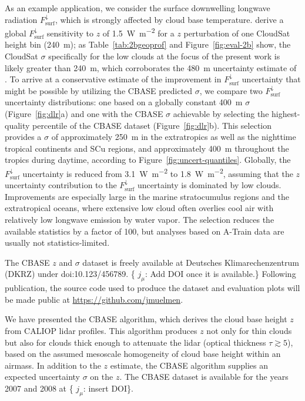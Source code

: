 \documentclass[essd,manuscript]{copernicus}\usepackage[]{graphicx}\usepackage[]{color}
\newcommand{\hlnum}[1]{\textcolor[rgb]{0.686,0.059,0.569}{#1}}%
\newcommand\comment[2]{\{\hlnum{ \textit{#1}: #2}\}}
\newcommand\commentjm[1]{\comment{$j_\mu$}{#1}}
\newcommand\CBH{\ensuremath{z}}
\newcommand\DLR{\ensuremath{F_\text{surf}^\downarrow}}
\begin{document}
As an example application, we consider the surface downwelling longwave
radiation \DLR{}, which is strongly affected by cloud base temperature.
\cite{Henderson2013} derive a global \DLR{} sensitivity to \CBH{} of
1.5~\unit{W~m^{-2}} for a \CBH{} perturbation of one CloudSat height bin
(240~\unit{m}); as Table~\ref{tab:2bgeoprof} and Figure~\ref{fig:eval-2b} show,
the CloudSat $\sigma$ specifically for the low clouds at the focus of the
present work is likely greater than 240~\unit{m}, which corroborates the
480~\unit{m} uncertainty estimate of \cite{Kato2011}. To arrive at a
conservative estimate of the improvement in \DLR{} uncertainty that might be
possible by utilizing the CBASE predicted $\sigma$, we compare two \DLR{}
uncertainty distributions: one based on a globally constant 400~\unit{m} $\sigma$
(Figure~\ref{fig:dlr}a) and one with the CBASE $\sigma$ achievable by selecting
the highest-quality percentile of the CBASE dataset
(Figure~\ref{fig:dlr}b). This selection provides a $\sigma$ of approximately
250~\unit{m} in the extratropics as well as the nighttime tropical continents
and SCu regions, and approximately 400~\unit{m} throughout the tropics during
daytime, according to Figure~\ref{fig:uncert-quantiles}.  Globally, the \DLR{}
uncertainty is reduced from 3.1~\unit{W~m^{-2}} to 1.8~\unit{W~m^{-2}}, assuming
that the \CBH{} uncertainty contribution to the \DLR{} uncertainty is dominated
by low clouds.  Improvements are especially large in the marine stratocumulus
regions and the extratropical oceans, where extensive low cloud often overlies
cool air with relatively low longwave emission by water vapor. The selection
reduces the available statistics by a factor of 100, but analyses based on
A-Train data are usually not statistics-limited.

The CBASE \CBH{} and $\sigma$ dataset \citep{cbase} is freely available at
Deutsches Klimarechenzentrum (DKRZ) under doi:10.123/456789.  \commentjm{Add DOI
once it is available.}  Following publication, the source code used to produce
the dataset and evaluation plots will be made public at
\url{https://github.com/jmuelmen}. 

\conclusions
\label{sec:conclusions}

We have presented the CBASE algorithm, which derives the cloud base height \CBH{} from CALIOP lidar
profiles.  This algorithm produces \CBH{} not only for thin clouds but also for
clouds thick enough to attenuate the lidar (optical thickness $\tau \gtrsim 5$),
based on the assumed mesoscale homogeneity of cloud base height within an
airmass.  In addition to the \CBH{} estimate, the CBASE algorithm supplies an
expected uncertainty $\sigma$ on the \CBH{}.  The CBASE dataset is available for the years 2007
and 2008 at \commentjm{insert DOI}.
\end{document}
